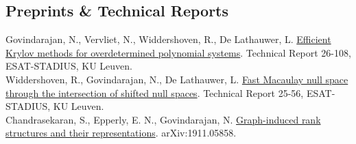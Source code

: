 \documentclass[10pt, a4paper]{article}
\newcommand{\years}[1]{\marginnote{\makebox[\marginparwidth][r]{\scriptsize\color{cvmuted}#1}} }
\begin{document}
\subsection*{Preprints \& Technical Reports}
\years{2026} Govindarajan, N., Vervliet, N., Widdershoven, R., De Lathauwer, L. \href{https://nithingovindarajan.github.io/assets/pdf/Krylov2026.pdf}{Efficient Krylov methods for overdetermined polynomial systems}. Technical Report 26-108, ESAT-STADIUS, KU Leuven.\\
\years{2025} Widdershoven, R., Govindarajan, N., De Lathauwer, L. \href{https://ftp.esat.kuleuven.be/pub/stadius//rwidders/widdershoven2025mini_preprint.pdf}{Fast Macaulay null space through the intersection of shifted null spaces}. Technical Report 25-56, ESAT-STADIUS, KU Leuven.\\
\years{2019} Chandrasekaran, S., Epperly, E. N., Govindarajan, N. \href{https://arxiv.org/pdf/1911.05858.pdf}{Graph-induced rank structures and their representations}. arXiv:1911.05858.
\end{document}
